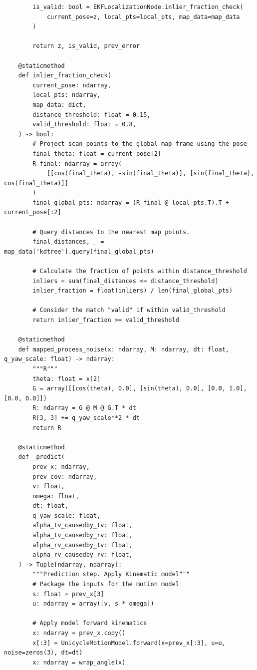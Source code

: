 \begin{verbatim}
        is_valid: bool = EKFLocalizationNode.inlier_fraction_check(
            current_pose=z, local_pts=local_pts, map_data=map_data
        )

        return z, is_valid, prev_error

    @staticmethod
    def inlier_fraction_check(
        current_pose: ndarray,
        local_pts: ndarray,
        map_data: dict,
        distance_threshold: float = 0.15,
        valid_threshold: float = 0.8,
    ) -> bool:
        # Project scan points to the global map frame using the pose
        final_theta: float = current_pose[2]
        R_final: ndarray = array(
            [[cos(final_theta), -sin(final_theta)], [sin(final_theta), cos(final_theta)]]
        )
        final_global_pts: ndarray = (R_final @ local_pts.T).T + current_pose[:2]

        # Query distances to the nearest map points.
        final_distances, _ = map_data['kdtree'].query(final_global_pts)

        # Calculate the fraction of points within distance_threshold
        inliers = sum(final_distances <= distance_threshold)
        inlier_fraction = float(inliers) / len(final_global_pts)

        # Consider the match "valid" if within valid_threshold
        return inlier_fraction >= valid_threshold

    @staticmethod
    def mapped_process_noise(x: ndarray, M: ndarray, dt: float, q_yaw_scale: float) -> ndarray:
        """R"""
        theta: float = x[2]
        G = array([[cos(theta), 0.0], [sin(theta), 0.0], [0.0, 1.0], [0.0, 0.0]])
        R: ndarray = G @ M @ G.T * dt
        R[3, 3] += q_yaw_scale**2 * dt
        return R

    @staticmethod
    def _predict(
        prev_x: ndarray,
        prev_cov: ndarray,
        v: float,
        omega: float,
        dt: float,
        q_yaw_scale: float,
        alpha_tv_causedby_tv: float,
        alpha_tv_causedby_rv: float,
        alpha_rv_causedby_tv: float,
        alpha_rv_causedby_rv: float,
    ) -> Tuple[ndarray, ndarray]:
        """Prediction step. Apply Kinematic model"""
        # Package the inputs for the motion model
        s: float = prev_x[3]
        u: ndarray = array([v, s * omega])

        # Apply model forward kinematics
        x: ndarray = prev_x.copy()
        x[:3] = UnicycleMotionModel.forward(x=prev_x[:3], u=u, noise=zeros(3), dt=dt)
        x: ndarray = wrap_angle(x)


\end{verbatim}
